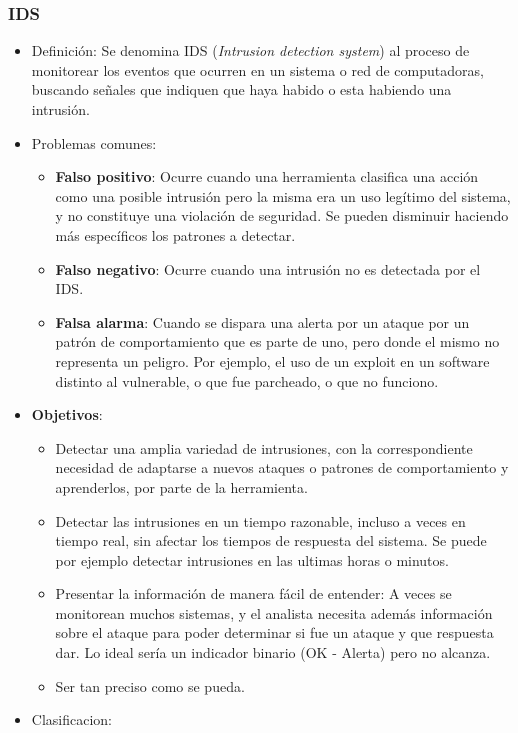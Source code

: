 \subsubsection{IDS}

\begin{itemize}
	\item Definición: Se denomina IDS (\textit{Intrusion detection system}) al proceso de monitorear los eventos que ocurren en un sistema o red de
	computadoras, buscando señales que indiquen que haya habido o esta habiendo una intrusión.
	\item Problemas comunes: \begin{itemize}
		\item \textbf{Falso positivo}: Ocurre cuando una herramienta clasifica una acción como una posible intrusión pero la misma era un uso
		legítimo del sistema, y no constituye una violación de seguridad. Se pueden disminuir haciendo más específicos los patrones a detectar.
		\item \textbf{Falso negativo}: Ocurre cuando una intrusión no es detectada por el IDS.
		\item \textbf{Falsa alarma}: Cuando se dispara una alerta por un ataque por un patrón de comportamiento que es parte de uno, pero donde el mismo
		no representa un peligro. Por ejemplo, el uso de un exploit en un software distinto al vulnerable, o que fue parcheado, o que no funciono.
	\end{itemize}
	\item \textbf{Objetivos}: \begin{itemize}
		\item Detectar una amplia variedad de intrusiones, con la correspondiente necesidad de adaptarse a nuevos ataques o patrones de comportamiento y
		aprenderlos, por parte de la herramienta.
		\item Detectar las intrusiones en un tiempo razonable, incluso a veces en tiempo real, sin afectar los tiempos de respuesta del sistema. Se puede
		por ejemplo detectar intrusiones en las ultimas horas o minutos.
		\item Presentar la información de manera fácil de entender: A veces se monitorean muchos sistemas, y el analista necesita además información sobre
		el ataque para poder determinar si fue un ataque y que respuesta dar. Lo ideal sería un indicador binario (OK - Alerta) pero no alcanza.
		\item Ser tan preciso como se pueda.
	\end{itemize}
	\item Clasificacion: \begin{itemize}

\end{itemize}
\end{itemize}
